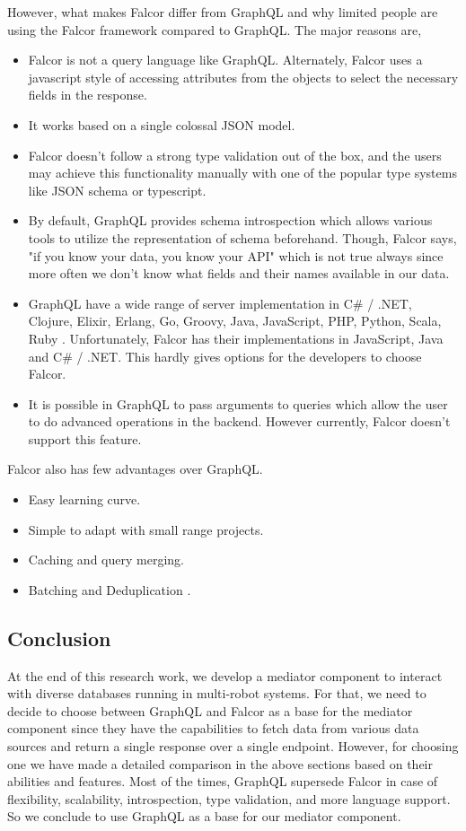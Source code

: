 	However, what makes Falcor differ from GraphQL and why limited people are using the Falcor framework compared to GraphQL. The major reasons are,
	\begin{itemize}
		\item Falcor is not a query language like GraphQL. Alternately, Falcor uses a javascript style of accessing attributes from the objects to select the necessary fields in the response.
		\item It works based on a single colossal JSON model.
		\item Falcor doesn't follow a strong type validation out of the box, and the users may achieve this functionality manually with one of the popular type systems like JSON schema or typescript.
		\item By default, GraphQL provides schema introspection which allows various tools to utilize the representation of schema beforehand. Though, Falcor says, "if you know your data, you know your API" \cite{misc04} which is not true always since more often we don't know what fields and their names available in our data.
		\item GraphQL have a wide range of server implementation in C\# / .NET, Clojure, Elixir, Erlang, Go, Groovy, Java, JavaScript, PHP, Python, Scala, Ruby \cite{misc05}. Unfortunately, Falcor has their implementations in JavaScript, Java and C\# / .NET. This hardly gives options for the developers to choose Falcor.
		\item It is possible in GraphQL to pass arguments to queries which allow the user to do advanced operations in the backend. However currently, Falcor doesn't support this feature.
	\end{itemize}

	Falcor also has few advantages over GraphQL. 
	\begin{itemize}
		\item Easy learning curve.
		\item Simple to adapt with small range projects.
		\item Caching and query merging.
		\item Batching and Deduplication \cite{misc06}.
	\end{itemize}

	\subsection{Conclusion} \label{sec:graphql_falcor_conclusion}
	At the end of this research work, we develop a mediator component to interact with diverse databases running in multi-robot systems. For that, we need to decide to choose between GraphQL and Falcor as a base for the mediator component since they have the capabilities to fetch data from various data sources and return a single response over a single endpoint. However, for choosing one we have made a detailed comparison in the above sections based on their abilities and features. Most of the times, GraphQL supersede Falcor in case of flexibility, scalability, introspection, type validation, and more language support. So we conclude to use GraphQL as a base for our mediator component.

